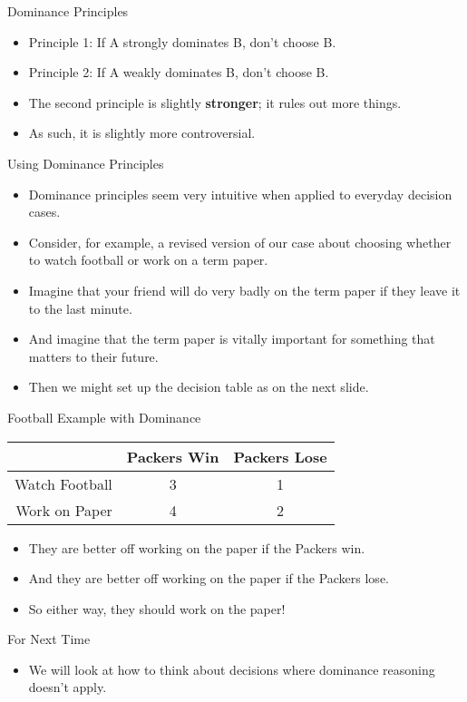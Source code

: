 \documentclass[
  ignorenonframetext,
]{beamer}
\providecommand{\tightlist}{%
  \setlength{\itemsep}{0pt}\setlength{\parskip}{0pt}}
\renewcommand{\,}{\text{, }}
\begin{document}
\begin{frame}{Dominance Principles}
\protect\hypertarget{dominance-principles}{}

\begin{itemize}
\tightlist
\item
  Principle 1: If A strongly dominates B, don't choose B.
\item
  Principle 2: If A weakly dominates B, don't choose B.
\item
  The second principle is slightly \textbf{stronger}; it rules out more
  things.
\item
  As such, it is slightly more controversial.
\end{itemize}

\end{frame}

\begin{frame}{Using Dominance Principles}
\protect\hypertarget{using-dominance-principles}{}

\begin{itemize}
\tightlist
\item
  Dominance principles seem very intuitive when applied to everyday
  decision cases.
\item
  Consider, for example, a revised version of our case about choosing
  whether to watch football or work on a term paper.
\item
  Imagine that your friend will do very badly on the term paper if they
  leave it to the last minute.
\item
  And imagine that the term paper is vitally important for something
  that matters to their future.
\item
  Then we might set up the decision table as on the next slide.
\end{itemize}

\end{frame}

\begin{frame}{Football Example with Dominance}
\protect\hypertarget{football-example-with-dominance}{}

\begin{longtable}[]{@{}rcc@{}}
\toprule
& Packers Win & Packers Lose\tabularnewline
\midrule
\endhead
Watch Football & 3 & 1\tabularnewline
Work on Paper & 4 & 2\tabularnewline
\bottomrule
\end{longtable}

\begin{itemize}
\tightlist
\item
  They are better off working on the paper if the Packers win.
\item
  And they are better off working on the paper if the Packers lose.
\item
  So either way, they should work on the paper!
\end{itemize}

\end{frame}

\begin{frame}{For Next Time}
\protect\hypertarget{for-next-time}{}

\begin{itemize}
\tightlist
\item
  We will look at how to think about decisions where dominance reasoning
  doesn't apply.
\end{itemize}

\end{frame}
\end{document}
